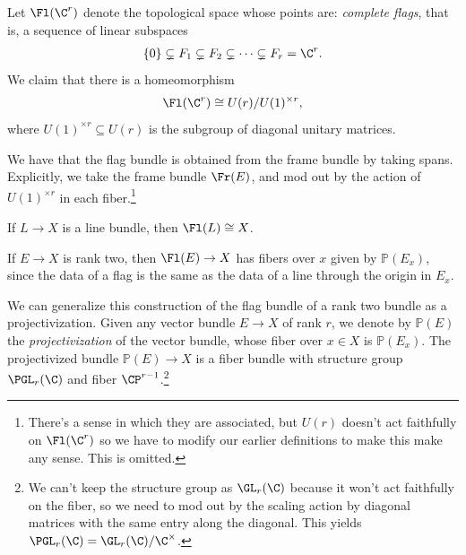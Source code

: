 \documentclass[11pt]{book}
\begin{document}
\begin{definition}\label{def:complete-flag-manifold} Let $\Fl(\C^r)$ denote the topological space whose points are: \emph{complete flags}, that is, a sequence of linear subspaces
\begin{align*}
    \{0\} \subsetneq F_1 \subsetneq F_2 \subsetneq \cdots \subsetneq F_r = \C^r.
\end{align*}
We claim that there is a homeomorphism
\begin{align*}
    \Fl(\C^r)\cong U(r)/U(1)^{\times r},
\end{align*}
where $U(1)^{\times r} \subseteq U(r)$ is the subgroup of diagonal unitary matrices.
\end{definition}

\begin{remark} We have that the flag bundle is obtained from the frame bundle by taking spans. Explicitly, we take the frame bundle $\Fr(E)$, and mod out by the action of $U(1)^{\times r}$ in each fiber.\footnote{There's a sense in which they are associated, but $U(r)$ doesn't act faithfully on $\Fl(\C^r)$ so we have to modify our earlier definitions to make this make any sense. This is omitted.}
\end{remark}

\begin{example} If $L \to X$ is a line bundle, then $\Fl(L) \cong X$.
\end{example}

\begin{example} If $E \to X$ is rank two, then $\Fl(E) \to X$ has fibers over $x$ given by $\mathbb{P}(E_x)$, since the data of a flag is the same as the data of a line through the origin in $E_x$.
\end{example}

\begin{definition}\label{def:projectivization-vector-bundle}
We can generalize this construction of the flag bundle of a rank two bundle as a projectivization. Given any vector bundle $E \to X$ of rank $r$, we denote by $\mathbb{P}(E)$ the \emph{projectivization} of the vector bundle, whose fiber over $x\in X$ is $\mathbb{P}(E_x)$. The projectivized bundle $\mathbb{P}(E) \to X$ is a fiber bundle with structure group $\PGL_r(\C)$ and fiber $\CP^{r-1}$.\footnote{We can't keep the structure group as $\GL_r(\C)$ because it won't act faithfully on the fiber, so we need to mod out by the scaling action by diagonal matrices with the same entry along the diagonal. This yields $\PGL_r(\C) = \GL_r(\C)/\C^\times$.}
\end{definition}
\end{document}
